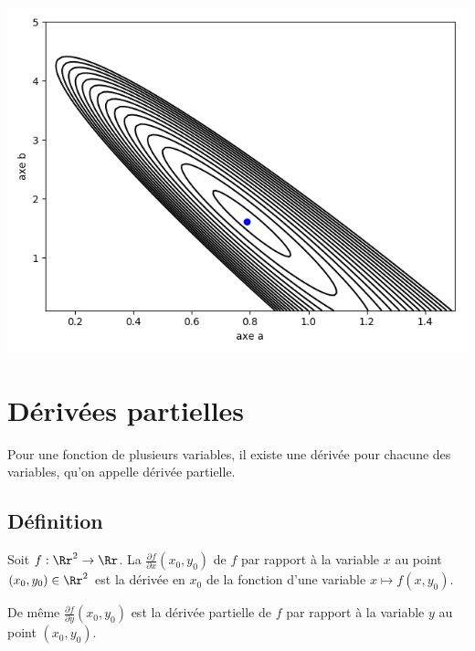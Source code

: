 \begin{exemple}{}{}
	
	\begin{center}
		\includegraphics[scale=\myscale,scale=0.7]{figures/fonctions-regression}
	\end{center}
	
\end{exemple}




\section{Dérivées partielles}

Pour une fonction de plusieurs variables, il existe une dérivée pour chacune des variables, qu'on appelle dérivée partielle. 

\subsection{Définition}


\begin{definition}{}{}
	Soit $f : \Rr^2 \to \Rr$. 
	La  $\frac{\partial f}{\partial x} (x_0,y_0)$ de $f$ par rapport à la variable $x$ au point $(x_0,y_0) \in \Rr^2$ est la dérivée en $x_0$ de 
	la fonction d'une variable $x \mapsto f(x, y_0)$.
	
	De même $\frac{\partial f}{\partial y} (x_0,y_0)$ est la dérivée partielle de $f$ par rapport à la variable $y$ au point $(x_0,y_0)$.
	
	
\end{definition}


